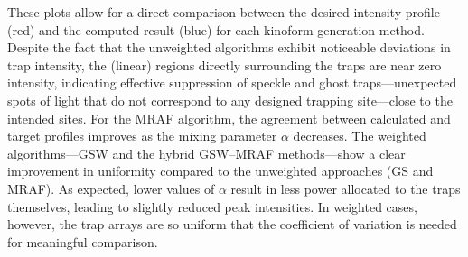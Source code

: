 \documentclass[../Thesis-IJspeert.tex]{subfiles}
\begin{document}
These plots allow for a direct comparison between the desired intensity profile (red) and the computed result (blue) for each kinoform generation method. Despite the fact that the unweighted algorithms exhibit noticeable deviations in trap intensity, the (linear) regions directly surrounding the traps are near zero intensity, indicating effective suppression of speckle and ghost traps---unexpected spots of light that do not correspond to any designed trapping site---close to the intended sites. For the MRAF algorithm, the agreement between calculated and target profiles improves as the mixing parameter $\alpha$ decreases. The weighted algorithms---GSW and the hybrid GSW--MRAF methods---show a clear improvement in uniformity compared to the unweighted approaches (GS and MRAF). As expected, lower values of $\alpha$ result in less power allocated to the traps themselves, leading to slightly reduced peak intensities. In weighted cases, however, the trap arrays are so uniform that the coefficient of variation is needed for meaningful comparison.
\end{document}
